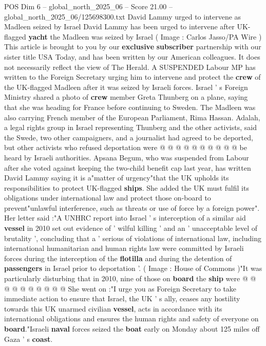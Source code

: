 \begin{textsample}{POS Dim 6 – global\_north\_2025\_06 – Score 21.00 – global\_north\_2025\_06/125698300.txt}  \label{ex:f6_pos_021}
David Lammy urged to intervene as Madleen seized by Israel David Lammy has been urged to intervene after UK-flagged \textbf{yacht} the Madleen was seized by Israel ( Image : Carlos Jasso/PA Wire ) This article is brought to you by our \textbf{exclusive} \textbf{subscriber} partnership with our sister title USA Today, and has been written by our American colleagues.
It does not necessarily reflect the view of The Herald.
A SUSPENDED Labour MP has written to the Foreign Secretary urging him to intervene and protect the \textbf{crew} of the UK-flagged Madleen after it was seized by Israeli forces.
Israel ' s Foreign Ministry shared a photo of \textbf{crew} member Greta Thunberg on a plane, saying that she was heading for France before continuing to Sweden.
The Madleen was also carrying French member of the European Parliament, Rima Hassan.
Adalah, a legal rights group in Israel representing Thunberg and the other activists, said the Swede, two other campaigners, and a journalist had agreed to be deported, but other activists who refused deportation were @ @ @ @ @ @ @ @ @ @ be heard by Israeli authorities.
Apsana Begum, who was suspended from Labour after she voted against keeping the two-child benefit cap last year, has written David Lammy saying it is a"matter of urgency"that the UK upholds its responsibilities to protect UK-flagged \textbf{ships}.
She added the UK must fulfil its obligations under international law and protect those on-board to prevent"unlawful interference, such as threats or use of force by a foreign power".
Her letter said :"A UNHRC report into Israel ' s interception of a similar aid \textbf{vessel} in 2010 set out evidence of ' wilful killing ' and an ' unacceptable level of brutality ', concluding that a ' serious of violations of international law, including international humanitarian and human rights law were committed by Israeli forces during the interception of the \textbf{flotilla} and during the detention of \textbf{passengers} in Israel prior to deportation '. ( Image : House of Commons )"It was particularly disturbing that in 2010, nine of those on \textbf{board} the \textbf{ship} were @ @ @ @ @ @ @ @ @ @ She went on :"I urge you as Foreign Secretary to take immediate action to ensure that Israel, the UK ' s ally, ceases any hostility towards this UK unarmed civilian \textbf{vessel}, acts in accordance with its international obligations and ensures the human rights and safety of everyone on \textbf{board}."Israeli \textbf{naval} forces seized the \textbf{boat} early on Monday about 125 miles off Gaza ' s \textbf{coast}.

\end{textsample}
